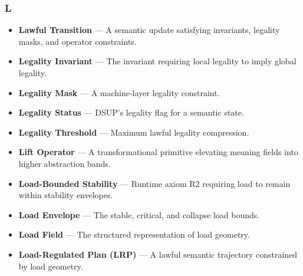 \subsubsection*{L}
\begin{itemize}
    \item \textbf{Lawful Transition} — A semantic update satisfying invariants,
    legality masks, and operator constraints.

    \item \textbf{Legality Invariant} — The invariant requiring local legality to
    imply global legality.

    \item \textbf{Legality Mask} — A machine‑layer legality constraint.

    \item \textbf{Legality Status} — DSUP’s legality flag for a semantic state.

    \item \textbf{Legality Threshold} — Maximum lawful legality compression.

    \item \textbf{Lift Operator} — A transformational primitive elevating meaning
    fields into higher abstraction bands.

    \item \textbf{Load-Bounded Stability} — Runtime axiom R2 requiring load to
    remain within stability envelopes.

    \item \textbf{Load Envelope} — The stable, critical, and collapse load bounds.

    \item \textbf{Load Field} — The structured representation of load geometry.

    \item \textbf{Load-Regulated Plan (LRP)} — A lawful semantic trajectory
    constrained by load geometry.
\end{itemize}


